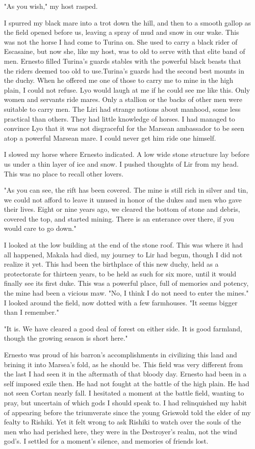 \documentclass{article}
\begin{document}
"As you wish," my host rasped.

I spurred my black mare into a trot down the hill, and then to a smooth gallop as the field opened before us, leaving a spray of mud and snow in our wake. This was not the horse I had come to Turina on. She used to carry a black rider of Escasaine, but now she, like my host, was to old to serve with that elite band of men. Ernesto filled Turina's guards stables with the powerful black beasts that the riders deemed too old to use.Turina's guards had the second best mounts in the duchy. When he offered me one of those to carry me to mine in the high plain, I could not refuse. Lyo would laugh at me if he could see me like this. Only women and servants ride mares. Only a stallion or the backs of other men were suitable to carry men. The Liri had strange notions about manhood, some less practical than others. They had little knowledge of horses. I had managed to convince Lyo that it was not disgraceful for the Marsean ambassador to be seen atop a powerful Marsean mare. I could never get him ride one himself.

I slowed my horse where Ernesto indicated. A low wide stone structure lay before us under a thin layer of ice and snow. I pushed thoughts of Lir from my head. This was no place to recall other lovers. 

"As you can see, the rift has been covered. The mine is still rich in silver and tin, we could not afford to leave it unused in honor of the dukes and men who gave their lives. Eight or nine years ago, we cleared the bottom of stone and debris, covered the top, and started mining. There is an enterance over there, if you would care to go down."

I looked at the low building at the end of the stone roof. This was where it had all happened, Makala had died, my journey to Lir had begun, though I did not realize it yet. This had been the birthplace of this new duchy, held as a protectorate for thirteen years, to be held as such for six more, until it would finally see its first duke. This was a powerful place, full of memories and potency, the mine had been a vicious maw. "No, I think I do not need to enter the mines."
I looked around the field, now dotted with a few farmhouses. "It seems bigger than I remember."

"It is. We have cleared a good deal of forest on either side. It is good farmland, though the growing season is short here."

Ernesto was proud of his barron's accomplishments in civilizing this land and brining it into Marsea's fold, as he should be. This field was very different from the last I had seen it in the aftermath of that bloody day. Ernesto had been in a self imposed exile then. He had not fought at the battle of the high plain. He had not seen Cortan nearly fall. I hesitated a moment at the battle field, wanting to pray, but uncertain of which gods I should speak to. I had relinquished my habit of appearing before the triumverate since the young Griswold told the elder of my fealty to Rishiki. Yet it felt wrong to ask Rishiki to watch over the souls of the men who had perished here, they were in the Destroyer's realm, not the wind god's. I settled for a moment's silence, and memories of friends lost. 
\end{document}
